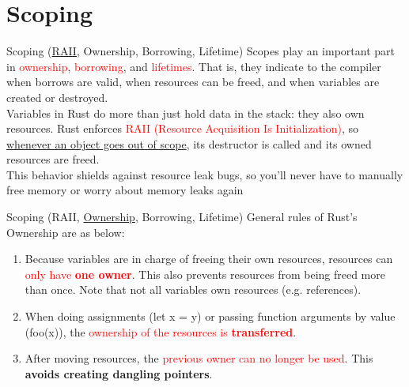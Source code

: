 \documentclass[10pt,xcolor={dvipsnames}, aspectratio=169]{beamer}
\begin{document}
\section{Scoping}
	\begin{frame}{Scoping (\underline{RAII}, Ownership, Borrowing, Lifetime)}
		Scopes play an important part in \textcolor{red}{ownership}, \textcolor{red}{borrowing}, and \textcolor{red}{lifetimes}. That is, they indicate to the compiler when borrows are valid, when resources can be freed, and when variables are created or destroyed.
		~\\Variables in Rust do more than just hold data in the stack: they also own resources. Rust enforces \textcolor{red}{RAII (Resource Acquisition Is Initialization)}, so \underline{whenever an object goes out of scope}, its destructor is called and its owned resources are freed.
		~\\This behavior shields against resource leak bugs, so you'll never have to manually free memory or worry about memory leaks again
	\end{frame}
	\begin{frame}{Scoping (RAII, \underline{Ownership}, Borrowing, Lifetime)}
		General rules of Rust's Ownership are as below:
		\begin{enumerate}
			\item Because variables are in charge of freeing their own resources, resources can \textcolor{red}{only have \textbf{one owner}}. This also prevents resources from being freed more than once. Note that not all variables own resources (e.g. references).
			\item When doing assignments (let x = y) or passing function arguments by value (foo(x)), the \textcolor{red}{ownership of the resources is \textbf{transferred}}.
			\item After moving resources, the \textcolor{red}{previous owner can no longer be used}. This \textbf{avoids creating dangling pointers}.
		\end{enumerate}
	\end{frame}
\end{document}
